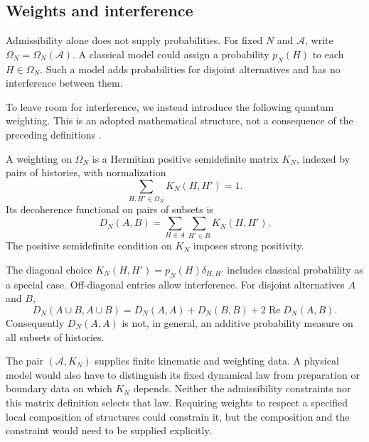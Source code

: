 
\subsection{Weights and interference}
\label{sec:weights}

Admissibility alone does not supply probabilities. For fixed $N$ and
$\mathcal A$, write $\Omega_N=\Omega_N(\mathcal A)$. A classical model
could assign a probability $p_N(H)$ to each $H\in\Omega_N$. Such a model
adds probabilities for disjoint alternatives and has no interference
between them.

To leave room for interference, we instead introduce the following quantum
weighting. This is an adopted mathematical structure, not a consequence of
the preceding definitions \citep{sorkin1994quantummeasure}.

\begin{definition}
A weighting on $\Omega_N$ is a Hermitian positive semidefinite matrix
$K_N$, indexed by pairs of histories, with normalization
\[
  \sum_{H,H'\in\Omega_N} K_N(H,H')=1.
\]
Its decoherence functional on pairs of subsets is
\[
  D_N(A,B)=\sum_{H\in A}\sum_{H'\in B}K_N(H,H').
\]
The positive semidefinite condition on $K_N$ imposes strong positivity.
\end{definition}

The diagonal choice $K_N(H,H')=p_N(H)\delta_{H,H'}$ includes classical
probability as a special case. Off-diagonal entries allow interference.
For disjoint alternatives $A$ and $B$,
\[
  D_N(A\cup B,A\cup B)
  =D_N(A,A)+D_N(B,B)+2\operatorname{Re}D_N(A,B).
\]
Consequently $D_N(A,A)$ is not, in general, an additive probability measure
on all subsets of histories.

The pair $(\mathcal A,K_N)$ supplies finite kinematic and weighting data.
A physical model would also have to distinguish its fixed dynamical law
from preparation or boundary data on which $K_N$ depends. Neither the
admissibility constraints nor this matrix definition selects that law.
Requiring weights to respect a specified local composition of structures
could constrain it, but the composition and the constraint would need to
be supplied explicitly.


